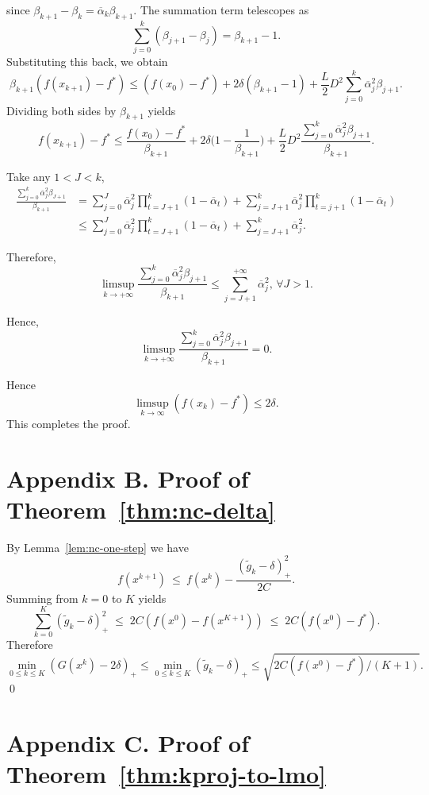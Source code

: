 \documentclass[smallextended]{svjour3}
\begin{document}
since $\beta_{k+1} - \beta_k = \overline\alpha_k \beta_{k+1}$. The summation term telescopes as
\[
\sum_{j = 0}^k (\beta_{j + 1} - \beta_j) = \beta_{k + 1} - 1.
\]
Substituting this back, we obtain
\[
\beta_{k + 1}(f( x_{k + 1}) - f^*) \le (f( x_0) - f^*) + 2\delta(\beta_{k + 1} - 1)
+ \frac{L}{2} D^2 \sum_{j = 0}^k \overline \alpha_j^2 \beta_{j + 1}.
\]
Dividing both sides by $\beta_{k + 1}$ yields
\[
f( x_{k + 1}) - f^* \le \frac{f( x_0) - f^*}{\beta_{k + 1}} + 2\delta\Big(1 - \frac{1}{\beta_{k + 1}}\Big)
+ \frac{L}{2} D^2 \frac{\sum_{j = 0}^k \overline \alpha_j^2 \beta_{j + 1}}{\beta_{k + 1}}.
\]

Take any $1 < J < k$,  
\[\begin{aligned}
    \frac{\sum_{j = 0}^k \overline \alpha_j^2 \beta_{J + 1}}{\beta_{k + 1}} &= \sum_{j = 0}^J \overline \alpha_j^2 \prod_{t = J + 1}^k (1 - \overline \alpha_t) + \sum_{j = J + 1}^k \overline \alpha_j^2 \prod_{t = j + 1}^k (1 - \overline \alpha_t)\\
    &\leq \sum_{j = 0}^J \overline \alpha_j^2 \prod_{t = J + 1}^k (1 - \overline \alpha_t) + \sum_{j = J + 1}^k \overline \alpha_j^2.
\end{aligned}\]

Therefore, \[\limsup_{k \rightarrow +\infty} \frac{\sum_{j = 0}^k \overline \alpha_j^2 \beta_{j + 1}}{\beta_{k + 1}} \leq \sum_{j = J + 1}^{+\infty} \overline{\alpha}_j^2,\, \forall J > 1.\]

Hence, \[\limsup_{k \rightarrow +\infty} \frac{\sum_{j = 0}^k \overline \alpha_j^2 \beta_{j + 1}}{\beta_{k + 1}} = 0.\]

Hence
\[
\limsup_{k\to\infty} (f( x_k) - f^*) \le 2\delta.
\]
This completes the proof.

\section*{Appendix B. Proof of Theorem~\ref{thm:nc-delta}}
By Lemma~\ref{lem:nc-one-step} we have
\[
f(x^{k+1})\ \le\ f(x^k) - \frac{(\tilde g_k-\delta)_+^2}{2C}.
\]
Summing from $k=0$ to $K$ yields
\[
\sum_{k=0}^K (\tilde g_k-\delta)_+^2 \;\le\; 2C(f(x^0)-f(x^{K+1})) \;\le\; 2C(f(x^0)-f^*).
\]
Therefore \[\min_{0\le k \le K} (G(x^k) - 2\delta)_+ \le \min_{0\le k\le K}(\tilde g_k-\delta)_+ \le \sqrt{2C(f(x^0)-f^*)/(K+1)}.\]  
\qed

\section*{Appendix C. Proof of Theorem~\ref{thm:kproj-to-lmo}}
\end{document}
